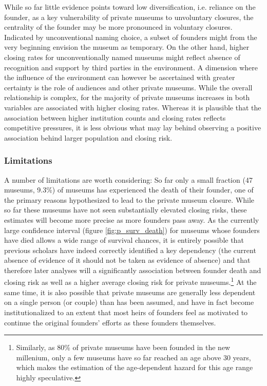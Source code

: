 \documentclass[12pt]{article}
\begin{document}
While so far little evidence points toward low diversification, i.e. reliance on the founder, as a key vulnerability of private museums to unvoluntary closures, the centrality of the founder may be more pronounced in voluntary closures. 
Indicated by unconventional naming choice, a subset of founders might from the very beginning envision the museum as temporary.
On the other hand, higher closing rates for unconventionally named museums might reflect absence of recognition and support by third parties in the environment.
A dimension where the influence of the environment can however be ascertained with greater certainty is the role of audiences and other private museums.
While the overall relationship is complex, for the majority of private museums increases in both variables are associated with higher closing rates.
Whereas it is plausible that the association between higher institution counts and closing rates reflects competitive pressures, it is less obvious what may lay behind observing a positive association behind larger population and closing risk. 
\subsubsection*{Limitations}





A number of limitations are worth considering:
So far only a small fraction (47 museums, 9.3\%) of museums has experienced the death of their founder, one of the primary reasons hypothesized to lead to the private museum closure. 
While so far these museums have not seen substantially elevated closing risks, these estimates will become more precise as more founders pass away.
As the currently large confidence interval (figure \ref{fig:p_surv_death}) for museums whose founders have died allows a wide range of survival chances, it is entirely possible that previous scholars have indeed correctly identified a key dependency (the current absence of evidence of it should not be taken as evidence of absence) and that therefore later analyses will a significantly association between founder death and closing risk as well as a higher average closing risk for private museums.\footnote{Similarly, as 80\% of private museums have been founded in the new millenium, only a few museums have so far reached an age above 30 years, which makes the estimation of the age-dependent hazard for this age range highly speculative.}
At the same time, it is also possible that private museums are generally less dependent on a single person (or couple) than has been assumed, and have in fact become institutionalized to an extent that most heirs of founders feel as motivated to continue the original founders' efforts as these founders themselves.
\end{document}
